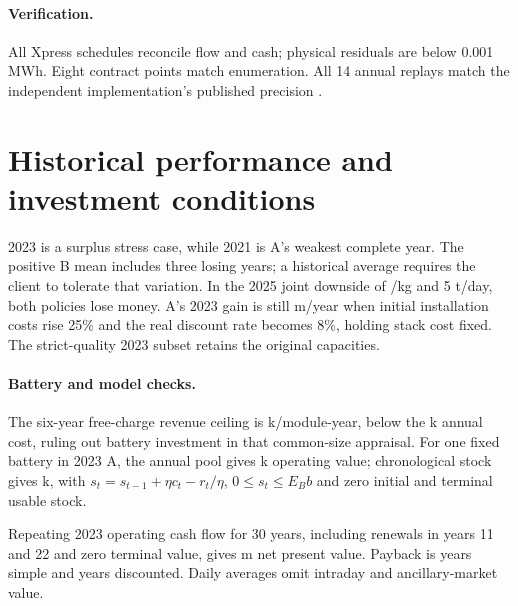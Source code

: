 \paragraph{Verification.}
All \CheckCount{} Xpress schedules reconcile flow and cash; physical residuals
are below 0.001 MWh. Eight contract points match enumeration. All 14 annual
replays match the independent implementation's published precision \cite{peer}.

\samplebreak
\section{Historical performance and investment conditions}

2023 is a surplus stress case, while 2021 is A's weakest complete year.
The positive B mean includes three losing years; a historical average
requires the client to tolerate that variation. In the 2025 joint downside
of /kg and 5 t/day, both policies lose money. A's 2023 gain is still
\gbp\CostStress m/year when initial installation costs rise 25\% and the
real discount rate becomes 8\%, holding stack cost fixed.
The strict-quality 2023 subset retains the original capacities.

\paragraph{Battery and model checks.}
The six-year free-charge revenue ceiling is \gbp\BatteryBound k/module-year,
below the \gbp\BatteryCost k annual cost, ruling out battery investment
in that common-size appraisal. For one fixed battery in 2023 A,
the annual pool gives \gbp\PoolValue k operating value; chronological
stock gives \gbp\StockValue k, with
\(s_t=s_{t-1}+\eta c_t-r_t/\eta\), \(0\le s_t\le E_Bb\) and zero
initial and terminal usable stock.


Repeating 2023 operating cash flow for 30 years, including renewals in years
11 and 22 and zero terminal value, gives \gbp\NPV m net present value.
Payback is \Payback{} years simple and \DiscountedPayback{} years discounted.
Daily averages omit intraday and ancillary-market value.
